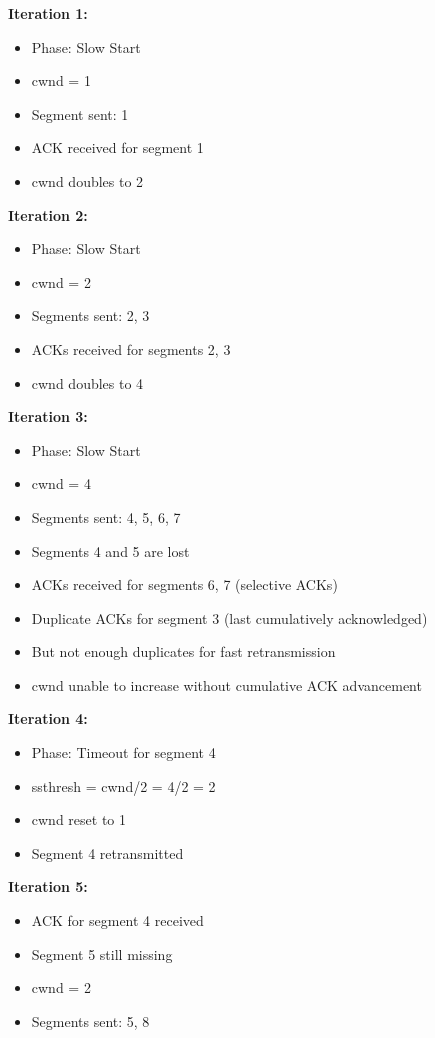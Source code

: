 \documentclass[11pt,a4paper]{article}
\begin{document}
\begin{tcolorbox}[title=Iteration-by-Iteration Analysis]
\textbf{Iteration 1:}
\begin{itemize}
    \item Phase: Slow Start
    \item cwnd = 1
    \item Segment sent: 1
    \item ACK received for segment 1
    \item cwnd doubles to 2
\end{itemize}

\textbf{Iteration 2:}
\begin{itemize}
    \item Phase: Slow Start
    \item cwnd = 2
    \item Segments sent: 2, 3
    \item ACKs received for segments 2, 3
    \item cwnd doubles to 4
\end{itemize}

\textbf{Iteration 3:}
\begin{itemize}
    \item Phase: Slow Start
    \item cwnd = 4
    \item Segments sent: 4, 5, 6, 7
    \item Segments 4 and 5 are lost
    \item ACKs received for segments 6, 7 (selective ACKs)
    \item Duplicate ACKs for segment 3 (last cumulatively acknowledged)
    \item But not enough duplicates for fast retransmission
    \item cwnd unable to increase without cumulative ACK advancement
\end{itemize}

\textbf{Iteration 4:}
\begin{itemize}
    \item Phase: Timeout for segment 4
    \item ssthresh = cwnd/2 = 4/2 = 2
    \item cwnd reset to 1
    \item Segment 4 retransmitted
\end{itemize}

\textbf{Iteration 5:}
\begin{itemize}
    \item ACK for segment 4 received
    \item Segment 5 still missing
    \item cwnd = 2
    \item Segments sent: 5, 8
\end{itemize}


\end{tcolorbox}
\end{document}
